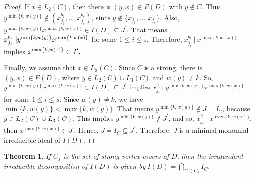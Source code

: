 \documentclass[11pt,reqno]{amsart}
\newtheorem{theorem}{Theorem}[section]
\theoremstyle{definition}
\begin{document}
\begin{proof}
    
If $ x \in L_2(C) $, then there is $ (y, x) \in E(D) $ with $ y \notin C $.  Thus $y^{\min\{k,w(y)\}} \notin ( x_{j_1}^{b_1}, \ldots, x_{j_s}^{b_s} ) $, since $y \notin \{ x_{j_1}, \ldots, x_{j_s} \} $. Also, $ {y}^{\min\{k,w(y)\}}{x}^{\max\{k,w(x)\}} \in I(D) \subseteq  J^{\prime}$. That means $ x_{j_i}^{b_i}
~|~\\  {y}^{\min\{k,w(y)\}}{x}^{\max\{k,w(x)\}} $ for some $ 1 \leq i \leq s $.   Therefore,  $ x_{j_i}^{b_i}
~|~  {x}^{\max\{k,w(x)\}} $  implies $ {x}^{\max\{k,w(x)\}}\\ \in J^{\prime}. $

Finally, we assume that  $ x  \in L_3(C) $. Since $ C $ is a strong,  there is $ (y, x) \in E(D) $, where $ y \in L_2(C) \cup L_3(C) $ and $ w(y) \neq k $.  
 So, $ {y}^{\min\{k,w(y)\}}{x}^{\max\{k,w(x)\}} \in I(D) \subseteq  J^{\prime} $ implies $ x_{j_i}^{b_i}
~|~  {y}^{\min\{k,w(y)\}}{x}^{\max\{k,w(x)\}} $ for some $ 1 \leq i \leq s $. Since $ w(y) \neq k $, we have $ {\min\{k,w(y)\}} < {\max\{k,w(y)\}} $. That means $ {y}^{\min\{k,w(y)\}} \notin J = I_C $, because $ y  \in L_2(C) \cup L_3(C) $. This implies $ {y}^{\min\{k,w(y)\}} \notin J^{\prime} $, and   so,  $ x_{j_i}^{b_i}
~|~  {x}^{\max\{k,w(x)\}} $, then $ {x}^{\max\{k,w(x)\}} \in J^{\prime}. $
Hence, $  J = I_C \subseteq  J^{\prime}$. Therefore, $ J $ is a minimal monomial irreducible ideal of $ I(D) $.
\end{proof} 

\begin{theorem} \label{irreducible}
If $ C_s $ is the set of strong vertex covers of $ D $, then the irredundant irreducible
decomposition of $ I(D) $ is given by $ I(D) =  \bigcap_{C \in C_s}  I_C. $

\end{theorem}
\end{document}
